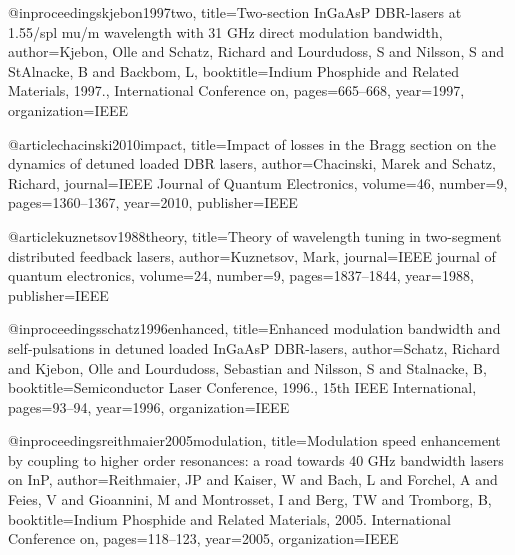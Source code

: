 @inproceedings{kjebon1997two,
  title={Two-section InGaAsP DBR-lasers at 1.55/spl mu/m wavelength with 31 GHz direct modulation bandwidth},
  author={Kjebon, Olle and Schatz, Richard and Lourdudoss, S and Nilsson, S and StAlnacke, B and Backbom, L},
  booktitle={Indium Phosphide and Related Materials, 1997., International Conference on},
  pages={665--668},
  year={1997},
  organization={IEEE}
}

@article{chacinski2010impact,
  title={Impact of losses in the Bragg section on the dynamics of detuned loaded DBR lasers},
  author={Chacinski, Marek and Schatz, Richard},
  journal={IEEE Journal of Quantum Electronics},
  volume={46},
  number={9},
  pages={1360--1367},
  year={2010},
  publisher={IEEE}
}

@article{kuznetsov1988theory,
  title={Theory of wavelength tuning in two-segment distributed feedback lasers},
  author={Kuznetsov, Mark},
  journal={IEEE journal of quantum electronics},
  volume={24},
  number={9},
  pages={1837--1844},
  year={1988},
  publisher={IEEE}
}

@inproceedings{schatz1996enhanced,
  title={Enhanced modulation bandwidth and self-pulsations in detuned loaded InGaAsP DBR-lasers},
  author={Schatz, Richard and Kjebon, Olle and Lourdudoss, Sebastian and Nilsson, S and Stalnacke, B},
  booktitle={Semiconductor Laser Conference, 1996., 15th IEEE International},
  pages={93--94},
  year={1996},
  organization={IEEE}
}

@inproceedings{reithmaier2005modulation,
  title={Modulation speed enhancement by coupling to higher order resonances: a road towards 40 GHz bandwidth lasers on InP},
  author={Reithmaier, JP and Kaiser, W and Bach, L and Forchel, A and Feies, V and Gioannini, M and Montrosset, I and Berg, TW and Tromborg, B},
  booktitle={Indium Phosphide and Related Materials, 2005. International Conference on},
  pages={118--123},
  year={2005},
  organization={IEEE}
}
